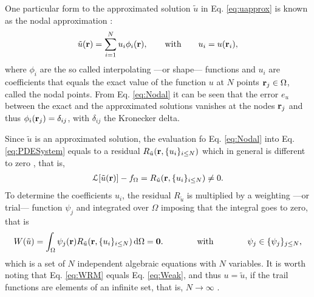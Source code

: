     One particular form to the approximated solution $\tilde{u}$ in Eq. \eqref{eq:uapprox} is known as the nodal approximation \cite{dhatt_finite_2012, fletcher_computational_1984}:
     \begin{align}
        \tilde{u}(\vb{r}) = \sum_{i = 1}^N u_i \phi_i(\vb{r}),
            \qquad
            \text{with}
            \qquad
        u_i = u(\vb{r}_i),
     \label{eq:Nodal}
     \end{align}
     where  $\phi_i$ are the so called interpolating ---or shape--- functions and $u_i$ are coefficients that equals the exact value of the function $u$ at $N$ points $\vb{r}_j \in \Omega$, called the nodal points. From Eq. \eqref{eq:Nodal} it can be seen that the error $e_{u}$ between the exact and the approximated solutions vanishes at the nodes $\vb{r}_j$ and thus $\phi_i(\vb{r}_j) = \delta_{ij}$, with $\delta_{ij}$ the Kronecker delta.

      Since $\tilde{u}$ is an approximated solution, the evaluation fo Eq. \eqref{eq:Nodal} into Eq. \eqref{eq:PDESystem} equals to a residual $  R_{\tilde{u}}(\vb{r},\{u_i\}_{i\leq N}) $ which in general is different to zero \cite{fletcher_computational_1984,larson_finite_2013}, that is,
     \begin{align}
         \mathcal{L}[\tilde{u}(\vb{r})] - {f}_\Omega = R_{\tilde{u}}(\vb{r},\{u_i\}_{i\leq N}) \neq 0.
     \label{eq:PDESystem-app}
     \end{align}
     To determine the coefficients $u_i$, the residual $R_{\tilde{u}}$ is multiplied by a weighting ---or trial--- function $\psi_j$ and integrated over $\Omega$ imposing that the integral goes to zero, that is
     \begin{align}
        W(\tilde{u}) = \int_\Omega \psi_j(\vb{r}) R_{\tilde{u}}(\vb{r},\{u_i\}_{i\leq N}) \dd{\Omega} = \vb{0}.
            \qquad\qquad
            \text{with}
            \qquad\qquad
        \psi_j \in \{\psi_j\}_{j\leq N},
     \label{eq:WRM}
     \end{align}
     which is a set of $N$ independent algebraic equations with $N$ variables.  It is worth noting that Eq. \eqref{eq:WRM} equals Eq. \eqref{eq:Weak}, and thus $u = \tilde{u}$, if the trail functions are elements of an infinite set, that is, $N \to \infty$ \cite{dhatt_finite_2012}.

